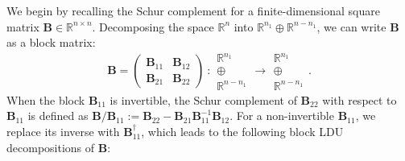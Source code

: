 \documentclass[noinfoline]{imsart}\setcounter{tocdepth}{2}
\renewcommand{\b}[1]{\mathbb{#1}} %
\newcommand{\m}[1]{\mathbf{#1}} %
\theoremstyle{plain}
\begin{document}
We begin by recalling the Schur complement for a finite-dimensional square matrix $\m{B} \in \b{R}^{n \times n}$. Decomposing the space $\b{R}^n$ into $\b{R}^{n_{1}} \oplus \b{R}^{n-n_{1}}$, we can write $\m{B}$ as a block matrix:
\begin{equation*}
    \m{B} = \begin{pmatrix}
    \m{B}_{11} & \m{B}_{12} \\
    \m{B}_{21} & \m{B}_{22}
    \end{pmatrix}
    \    :
    \begin{array}{c}
    \b{R}^{n_{1}} \\
    \oplus \\
    \b{R}^{n-n_{1}}
    \end{array}
    \rightarrow
    \begin{array}{c}
    \b{R}^{n_{1}} \\
    \oplus \\
    \b{R}^{n-n_{1}}
    \end{array}.
\end{equation*}
When the block $\m{B}_{11}$ is invertible, the Schur complement of $\m{B}_{22}$ with respect to $\m{B}_{11}$ is defined as $\m{B} / \m{B}_{11} := \m{B}_{22} - \m{B}_{21} \m{B}_{11}^{-1} \m{B}_{12}$. 
For a non-invertible $\m{B}_{11}$, we replace its inverse with $\m{B}_{11}^{\dagger}$, which leads to the following block LDU decompositions of $\m{B}$:
\end{document}
